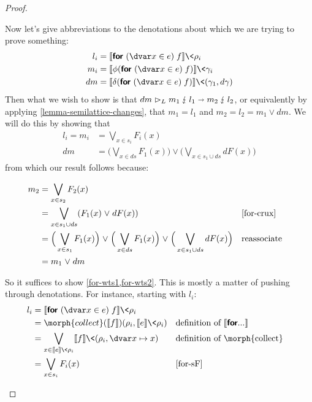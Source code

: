 \begin{proof}
\begin{description}[topsep=\baselineskip,itemsep=\baselineskip]
    \noindent
    Now let's give abbreviations to the denotations about which we are trying to prove something:
%
    \begin{align*}
      l_i &= \den{\eforvar x e f}\<\rho_i
      \\
      m_i &= \den{\phi(\eforvar x e f)}\<\gamma_i
      \\
      dm &= \den{\delta(\eforvar x e f)}\<(\gamma_1, \dgamma)
    \end{align*}
%
    Then what we wish to show is that
    \(\weirdat{L}{dm}{m_1}{l_1}{m_2}{l_2}\), or equivalently by applying \cref{lemma-semilattice-changes}, that
%
    $m_1 = l_1$ and $m_2 = l_2 = m_1 \vee dm$.
%
    We will do this by showing that
%
    \begin{align}
      \label{for-wts1}
      l_i = m_i &= \bigvee_{x \in s_i} F_i(x)
      \\\label{for-wts2}
      dm &= \Big(\bigvee_{x \in ds} F_1(x)\Big)
      \vee \Big(\bigvee_{x \in s_1 \cup ds} dF(x)\Big)
    \end{align}
%
    from which our result follows because:

    \begin{align*}
      m_2 &= \bigvee_{x \in s_2} F_2(x)\\
      &= \bigvee_{x \in s_1 \cup ds} (F_1(x) \vee dF(x))
      && \text{\cref{for-crux}}\\
      &= \Big(\bigvee_{x \in s_1} F_1(x)\Big)
      \vee \Big(\bigvee_{x \in ds} F_1(x)\Big)
      \vee \Big(\bigvee_{x \in s_1 \cup ds} dF(x)\Big)
      && \text{reassociate}\\
      &= m_1 \vee dm
    \end{align*}

    \noindent
    So it suffices to show \cref{for-wts1,for-wts2}. This is mostly a matter of pushing through denotations. For instance, starting with $l_i$:
%
    \begin{align*}
      l_i &= \den{\eforvar x e f}\<\rho_i\\
      &= \morph{collect}(\den{f})(\rho_i, \den{e}\<\rho_i)
      && \text{definition of }\den{\kw{for} ...}
      \\
      &= \bigvee_{x \in \den{e}\<\rho_i} \den{f}\<(\rho_i, \dvar x \mapsto x)
      && \text{definition of \morph{collect}}
      \\
      &= \bigvee_{x \in s_i} F_i(x)
      && \text{\cref{for-sF}}
    \end{align*}


\end{description}
\end{proof}
